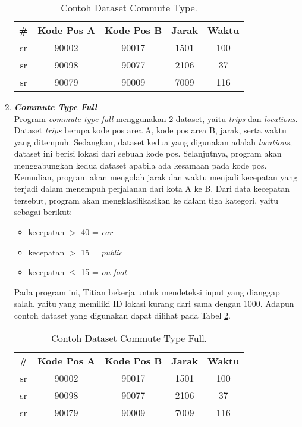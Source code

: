 \begin{enumerate}
            \begin{longtable}{|c|c|c|c|c|}
                  \caption{Contoh Dataset Commute Type.}
                  \label{tb:commutetypedataset} \\
                  \hline
                  \rowcolor[HTML]{C0C0C0}
                  \textbf{\#} & \textbf{Kode Pos A} & \textbf{Kode Pos B} & \textbf{Jarak} & \textbf{Waktu} \\
                  sr & 90002 & 90017 & 1501 & 100 \\
                  sr & 90098 & 90077 & 2106 & 37 \\
                  sr & 90079 & 90009 & 7009 & 116 \\
                  \hline
            \end{longtable}

      \item \emph{\textbf{Commute Type Full}} \\
            Program \emph{commute type full} menggunakan 2 dataset, yaitu \emph{trips} dan \emph{locations}. Dataset \emph{trips} berupa kode pos area A, kode pos area B, jarak, serta waktu yang ditempuh. Sedangkan, dataset kedua yang digunakan adalah \emph{locations}, dataset ini berisi lokasi dari sebuah kode pos. Selanjutnya, program akan menggabungkan kedua dataset apabila ada kesamaan pada kode pos. Kemudian, program akan mengolah jarak dan waktu menjadi kecepatan yang terjadi dalam menempuh perjalanan dari kota A ke B. Dari data kecepatan tersebut, program akan mengklasifikasikan ke dalam tiga kategori, yaitu sebagai berikut:
            \begin{itemize}
                  \item kecepatan $ > $ 40 = \emph{car}
                  \item kecepatan $ > $ 15 = \emph{public}
                  \item kecepatan $ \leq $ 15 = \emph{on foot}
            \end{itemize}
            Pada program ini, Titian bekerja untuk mendeteksi input yang dianggap salah, yaitu yang memiliki ID lokasi kurang dari sama dengan 1000.
            Adapun contoh dataset yang digunakan dapat 
            dilihat pada Tabel \ref{tb:commutetypefulldataset}.

            \begin{longtable}{|c|c|c|c|c|}
                  \caption{Contoh Dataset Commute Type Full.}
                  \label{tb:commutetypefulldataset} \\
                  \hline
                  \rowcolor[HTML]{C0C0C0}
                  \textbf{\#} & \textbf{Kode Pos A} & \textbf{Kode Pos B} & \textbf{Jarak} & \textbf{Waktu} \\
                  sr & 90002 & 90017 & 1501 & 100 \\
                  sr & 90098 & 90077 & 2106 & 37 \\
                  sr & 90079 & 90009 & 7009 & 116 \\
                  \hline
            \end{longtable}
      

\end{enumerate}
